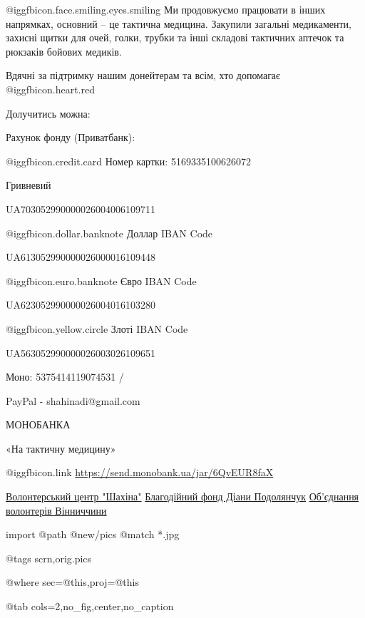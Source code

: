 @igg{fbicon.face.smiling.eyes.smiling} Ми продовжуємо працювати в інших
напрямках, основний – це тактична медицина.  Закупили загальні медикаменти,
захисні щитки для очей, голки, трубки та інші складові тактичних аптечок та
рюкзаків бойових медиків. 

Вдячні за підтримку нашим донейтерам та всім, хто допомагає @igg{fbicon.heart.red}

Долучитись можна:

Рахунок фонду (Приватбанк):\par
 @igg{fbicon.credit.card} Номер картки: 5169335100626072\par
Гривневий\par
UA703052990000026004006109711\par
 @igg{fbicon.dollar.banknote} Доллар IBAN Code\par
UA613052990000026000016109448\par
 @igg{fbicon.euro.banknote} Євро IBAN Code\par
UA623052990000026004016103280\par
 @igg{fbicon.yellow.circle} Злоті IBAN Code\par
UA563052990000026003026109651\par
Моно: 5375414119074531 /\par
PayPal - shahinadi@gmail.com\par
МОНОБАНКА \par
«На тактичну медицину» \par
 @igg{fbicon.link}  \url{https://send.monobank.ua/jar/6QvEUR8faX }\par

\obeycr
\href{https://www.facebook.com/profile.php?id=100081304876181}{Волонтерський центр "Шахіна"}
\href{https://www.facebook.com/shahinadi111}{Благодійний фонд Діани Подолянчук}
\href{https://www.facebook.com/groups/884456588253468/}{Об'єднання волонтерів Вінниччини}
\restorecr


\ifcmt
  import
    @path @new/pics
    @match *.jpg

    @tags scrn,orig.pics

    @where sec=@this,proj=@this
  
    @tab cols=2,no_fig,center,no_caption
\fi


